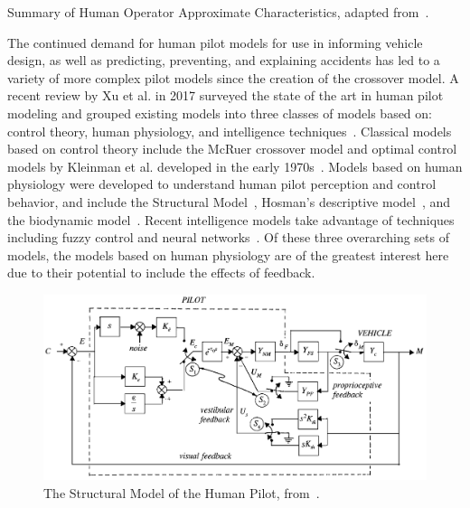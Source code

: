 \begin{table}[tb]
    \centering
    \caption[Summary of Human Operator Approximate Characteristics]{Summary of Human Operator Approximate Characteristics, adapted from~\citet{mcruer_mathematical_1974}.}
    \label{table:mcruer1974b}
\end{table}

The continued demand for human pilot models for use in informing vehicle design, as well as predicting, preventing, and explaining accidents has led to a variety of more complex pilot models since the creation of the crossover model.
A recent review by Xu et al. in 2017 surveyed the state of the art in human pilot modeling and grouped existing models into three classes of models based on: control theory, human physiology, and intelligence techniques~\citep{xu_review_2017}.
Classical models based on control theory include the McRuer crossover model and optimal control models by Kleinman et al. developed in the early 1970s~\citep{kleinman_optimal_1970, baron_optimal_1970}.
Models based on human physiology were developed to understand human pilot perception and control behavior, and include the Structural Model~\citep{hess_structural_1980, hess_model_1990, hess_unified_1997}, Hosman's descriptive model~\citep{hosman_pilots_nodate, hosman_pilots_1999}, and the biodynamic model~\citep{griffin_validation_2001}.
Recent intelligence models take advantage of techniques including fuzzy control and neural networks~\citep{zaychik_conspectus_2006, gestwa_modelling_2003}.
Of these three overarching sets of models, the models based on human physiology are of the greatest interest here due to their potential to include the effects of feedback.

\begin{figure}[tb!]
    \begin{center}
        \includegraphics[width=0.8\linewidth]{figures/Introduction/Screen_Shot_2018-07-31_at_11_21_44_AM.png}
        \caption[The Structural Model of the Human Pilot]{The Structural Model of the Human Pilot, from~\citet{hess_unified_1997}.}
        \label{figure:structuralmodel}
    \end{center}
\end{figure}


